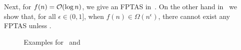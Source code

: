 Next, for $f(n) = \mathcal{O}(\log n)$, we give an FPTAS in~. On the other hand in~ we show that, for all $\epsilon \in (0,1]$, when $f(n) \in \Omega(n^\epsilon)$, there cannot exist any FPTAS unless \pnp.


\begin{figure}[h]
\centering
{}
    \qquad
{}
\caption{Examples for~ and~}
\end{figure}\label{fig:examples}
